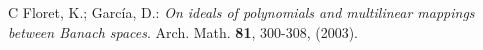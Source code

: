 \documentclass[12 pt]{article}%
\newtheorem{final remark}[theorem]{Final Remark}
\begin{document}
\begin{thebibliography}{C}
	 Floret, K.; Garc\'ia, D.: {\it On ideals of polynomials and multilinear mappings between Banach spaces}. Arch. Math. {\bf 81}, 300-308, (2003).
	
	
	
	
	
	
	
	
	
	
	
	
	

\end{thebibliography}
\end{document}
